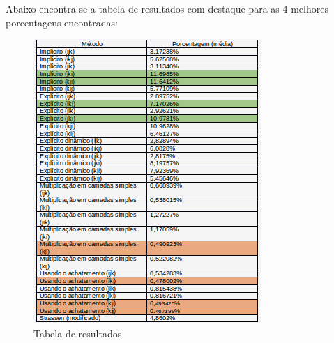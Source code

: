 \documentclass[a4paper, 10pt]{article}
\begin{document}
Abaixo encontra-se a tabela de resultados com destaque para as 4 melhores porcentagens encontradas:
\begin{figure}[!h]
\centering
\includegraphics[scale=0.9]{resultados}
\caption{Tabela de resultados}
\label{Resultados}
\end{figure}
\vspace{1cm}
\end{document}
